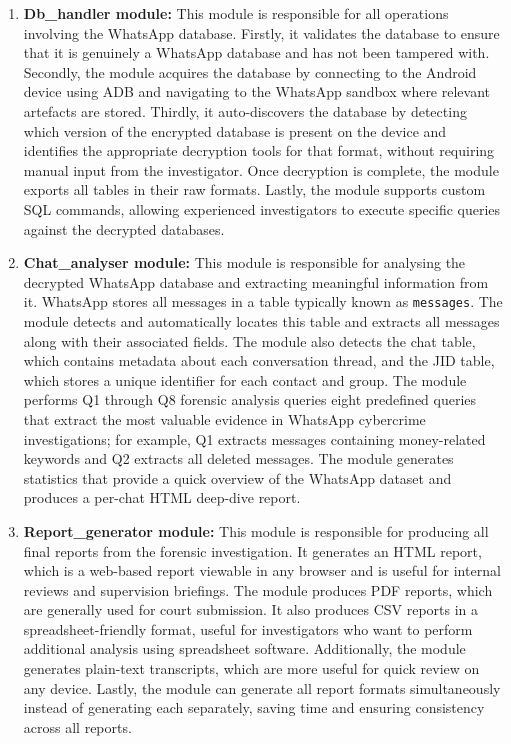 \documentclass[12pt,a4paper]{report}
\begin{document}
\begin{enumerate}
    \item \textbf{Db\_handler module:} This module is responsible for all operations involving the WhatsApp database. Firstly, it validates the database to ensure that it is genuinely a WhatsApp database and has not been tampered with. Secondly, the module acquires the database by connecting to the Android device using ADB and navigating to the WhatsApp sandbox where relevant artefacts are stored. Thirdly, it auto-discovers the database by detecting which version of the encrypted database is present on the device and identifies the appropriate decryption tools for that format, without requiring manual input from the investigator. Once decryption is complete, the module exports all tables in their raw formats. Lastly, the module supports custom SQL commands, allowing experienced investigators to execute specific queries against the decrypted databases.

    \item \textbf{Chat\_analyser module:} This module is responsible for analysing the decrypted WhatsApp database and extracting meaningful information from it. WhatsApp stores all messages in a table typically known as \texttt{messages}. The module detects and automatically locates this table and extracts all messages along with their associated fields. The module also detects the chat table, which contains metadata about each conversation thread, and the JID table, which stores a unique identifier for each contact and group. The module performs Q1 through Q8 forensic analysis queries eight predefined queries that extract the most valuable evidence in WhatsApp cybercrime investigations; for example, Q1 extracts messages containing money-related keywords and Q2 extracts all deleted messages. The module generates statistics that provide a quick overview of the WhatsApp dataset and produces a per-chat HTML deep-dive report.

    \item \textbf{Report\_generator module:} This module is responsible for producing all final reports from the forensic investigation. It generates an HTML report, which is a web-based report viewable in any browser and is useful for internal reviews and supervision briefings. The module produces PDF reports, which are generally used for court submission. It also produces CSV reports in a spreadsheet-friendly format, useful for investigators who want to perform additional analysis using spreadsheet software. Additionally, the module generates plain-text transcripts, which are more useful for quick review on any device. Lastly, the module can generate all report formats simultaneously instead of generating each separately, saving time and ensuring consistency across all reports.
\end{enumerate}
\end{document}
